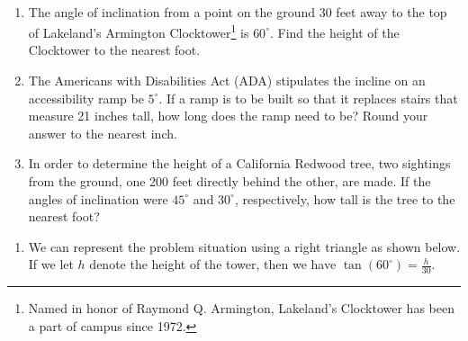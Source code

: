 \documentclass{ximera}
\begin{document}
\begin{example} \label{righttriangleex1} $~$

\begin{enumerate}

\item  The angle of inclination from a point on the ground 30 feet away to the top of Lakeland's Armington Clocktower\footnote{Named in honor of Raymond Q. Armington, Lakeland's Clocktower has been a part of campus since 1972.} is  $60^{\circ}$.  Find the height of the Clocktower to the nearest foot.

\item  The Americans with Disabilities Act (ADA) stipulates the incline on an accessibility ramp be $5^{\circ}$.  If a ramp is to be built so that it replaces stairs that measure 21 inches tall, how long does the ramp need to be?  Round your answer to the nearest inch.

\item  In order to determine the height of a California Redwood tree, two sightings from the ground, one 200 feet directly behind the other, are made.  If the angles of inclination were $45^{\circ}$ and $30^{\circ}$, respectively, how tall is the tree to the nearest foot?

\end{enumerate}

\begin{explanation}

\begin{enumerate}

\item  We can represent the problem situation using a right triangle as shown below.  If we let $h$ denote the height of the tower, then we have $\tan\left(60^{\circ}\right) = \frac{h}{30}$.

\begin{image}
\end{image}
\end{enumerate}
\end{explanation}
\end{example}
\end{document}
